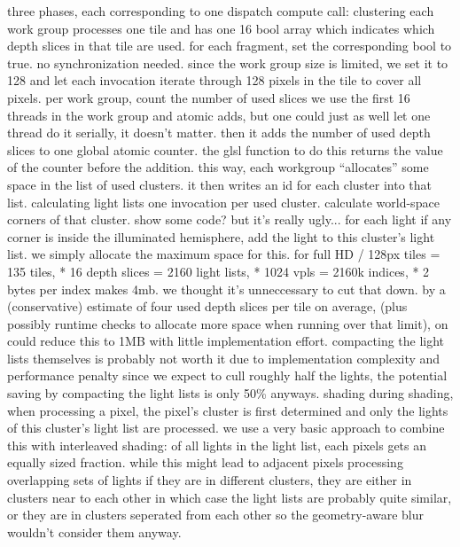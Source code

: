 \begin{outline}
\1 three phases, each corresponding to one dispatch compute call:
\1 clustering
    \2 each work group processes one tile and has one 16 bool array which indicates which depth slices in that tile are used.
    \2 for each fragment, set the corresponding bool to true. no synchronization needed.
    \2 since the work group size is limited, we set it to 128 and let each invocation iterate through 128 pixels in the tile to cover all pixels.
    \2 per work group, count the number of used slices
        \3 we use the first 16 threads in the work group and atomic adds, but one could just as well let one thread do it serially, it doesn't matter.
    \2 then it adds the number of used depth slices to one global atomic counter. the glsl function to do this returns the value of the counter before the addition.
    \2 this way, each workgroup ``allocates'' some space in the list of used clusters. it then writes an id for each cluster into that list.
\1 calculating light lists
    \2 one invocation per used cluster.
    \2 calculate world-space corners of that cluster.
    \2 show some code? but it's really ugly...
    \2 for each light
        \3 if any corner is inside the illuminated hemisphere, add the light to this cluster's light list.
    \2 we simply allocate the maximum space for this.
        \3 for full HD / 128px tiles = 135 tiles, * 16 depth slices = 2160 light lists, * 1024 vpls = 2160k indices, * 2 bytes per index makes 4mb.
        \3 we thought it's unneccessary to cut that down.
        \3 by a (conservative) estimate of four used depth slices per tile on average, (plus possibly runtime checks to allocate more space when running over that limit), on could reduce this to 1MB with little implementation effort.
        \3 compacting the light lists themselves is probably not worth it due to implementation complexity and performance penalty
        \3 since we expect to cull roughly half the lights, the potential saving by compacting the light lists is only 50\% anyways.
\1 shading
    \2 during shading, when processing a pixel, the pixel's cluster is first determined and only the lights of this cluster's light list are processed.
    \2 we use a very basic approach to combine this with interleaved shading: of all lights in the light list, each pixels gets an equally sized fraction. while this might lead to adjacent pixels processing overlapping sets of lights if they are in different clusters, they are either in clusters near to each other in which case the light lists are probably quite similar, or they are in clusters seperated from each other so the geometry-aware blur wouldn't consider them anyway.


\end{outline}
